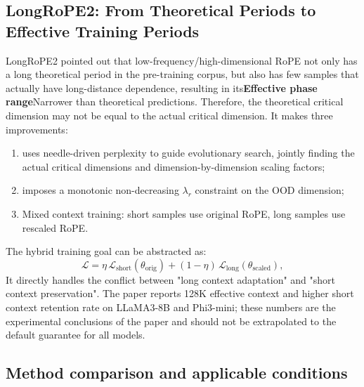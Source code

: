 \documentclass[UTF8,fontset=none,a4paper,10pt]{ctexart}
\newcommand{\term}[1]{\textbf{#1}}
\begin{document}
\subsection{LongRoPE2: From Theoretical Periods to Effective Training Periods}

LongRoPE2 pointed out that low-frequency/high-dimensional RoPE not only has a long theoretical period in the pre-training corpus, but also has few samples that actually have long-distance dependence, resulting in its\term{Effective phase range}Narrower than theoretical predictions\cite{longrope2}. Therefore, the theoretical critical dimension may not be equal to the actual critical dimension. It makes three improvements:
\begin{enumerate}
\item uses needle-driven perplexity to guide evolutionary search, jointly finding the actual critical dimensions and dimension-by-dimension scaling factors;
\item imposes a monotonic non-decreasing $\lambda_r$ constraint on the OOD dimension;
\item Mixed context training: short samples use original RoPE, long samples use rescaled RoPE.
\end{enumerate}
The hybrid training goal can be abstracted as:
\begin{equation}
  \mathcal{L}=\eta\,\mathcal{L}_{\mathrm{short}}(\theta_{\mathrm{orig}})
  +(1-\eta)\,\mathcal{L}_{\mathrm{long}}(\theta_{\mathrm{scaled}}),
  \label{eq:mixed-context-loss}
\end{equation}
It directly handles the conflict between "long context adaptation" and "short context preservation". The paper reports 128K effective context and higher short context retention rate on LLaMA3-8B and Phi3-mini; these numbers are the experimental conclusions of the paper and should not be extrapolated to the default guarantee \cite{longrope2} for all models.

\subsection{Method comparison and applicable conditions}
\end{document}
